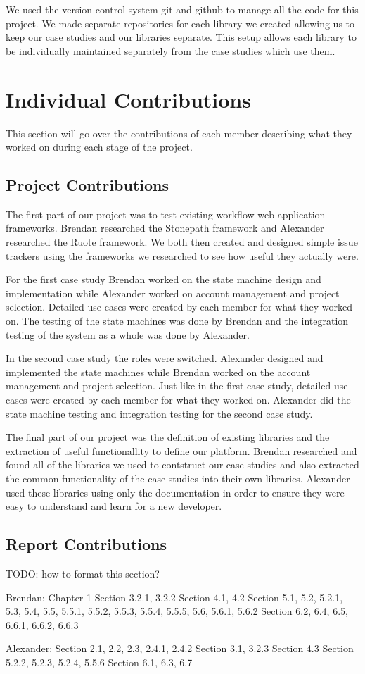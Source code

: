 \documentclass[document.tex]{subfiles}
\begin{document}
We used the version control system git and github to manage all the code for this project. We made separate repositories for each library we created allowing us to keep our case studies and our libraries separate. This setup allows each library to be individually  maintained separately from the case studies which use them. 

\section{Individual Contributions}

This section will go over the contributions of each member describing what they worked on during each stage of the project.

\subsection{Project Contributions}

The first part of our project was to test existing workflow web application frameworks. Brendan researched the Stonepath framework and Alexander researched the Ruote framework. We both then created and designed simple issue trackers using the frameworks we researched to see how useful they actually were.

For the first case study Brendan worked on the state machine design and implementation while Alexander worked on account management and project selection. Detailed use cases were created by each member for what they worked on. The testing of the state machines was done by Brendan and the integration testing of the system as a whole was done by Alexander.

In the second case study the roles were switched. Alexander designed and implemented the state machines while Brendan worked on the account management and project selection. Just like in the first case study, detailed use cases were created by each member for what they worked on. Alexander did the state machine testing and integration testing for the second case study.

The final part of our project was the definition of existing libraries and the extraction of useful functionallity to define our platform. Brendan researched and found all of the libraries we used to contstruct our case studies and also extracted the common functionality of the case studies into their own libraries. Alexander used these libraries using only the documentation in order to ensure they were easy to understand and learn for a new developer.

\subsection{Report Contributions}

TODO: how to format this section?

Brendan:
Chapter 1
Section 3.2.1, 3.2.2
Section 4.1, 4.2
Section 5.1, 5.2, 5.2.1, 5.3, 5.4, 5.5, 5.5.1, 5.5.2, 5.5.3, 5.5.4, 5.5.5, 5.6, 5.6.1, 5.6.2
Section 6.2, 6.4, 6.5, 6.6.1, 6.6.2, 6.6.3

Alexander:
Section 2.1, 2.2, 2.3, 2.4.1, 2.4.2
Section 3.1, 3.2.3
Section 4.3
Section 5.2.2, 5.2.3, 5.2.4, 5.5.6
Section 6.1, 6.3, 6.7
\end{document}

